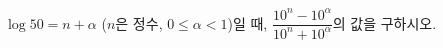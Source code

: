$\log 50=n+\alpha$ ($n$은 정수, $0\le\alpha<1$)일 때, $\dfrac{10^{n}-10^{\alpha}}{10^{n}+10^{\alpha}}$의 값을 구하시오.
